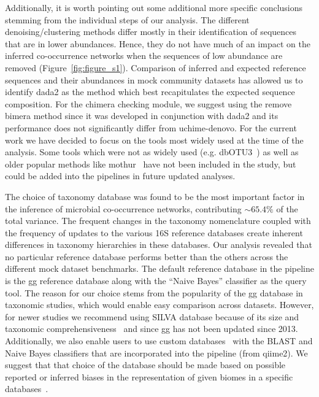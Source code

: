   Additionally, it is worth pointing out some additional more specific conclusions stemming from the individual steps of our analysis.
  The different denoising/clustering methods differ mostly in their identification of sequences that are in lower abundances.
  Hence, they do not have much of an impact on the inferred co-occurrence networks when the sequences of low abundance are removed (Figure~\ref{fig:figure_s1}).
  Comparison of inferred and expected reference sequences and their abundances in mock community datasets has allowed us to identify \ac{dada2} as the method which best recapitulates the expected sequence composition.
  For the chimera checking module, we suggest using the remove bimera method since it was developed in conjunction with \ac{dada2} and its performance does not significantly differ from uchime-denovo.
  For the current work we have decided to focus on the tools most widely used at the time of the analysis.
  Some tools which were not as widely used (e.g. dbOTU3~\cite{Olesen2017}) as well as older popular methods like mothur~\cite{Schloss2009} have not been included in the study, but could be added into the pipelines in future updated analyses.

  The choice of taxonomy database was found to be the most important factor in the inference of microbial co-occurrence networks, contributing $\sim65.4\%$ of the total variance.
  The frequent changes in the taxonomy nomenclature coupled with the frequency of updates to the various 16S reference databases create inherent differences \cite{Balvociute2017} in taxonomy hierarchies in these databases.
  Our analysis revealed that no particular reference database performs better than the others across the different mock dataset benchmarks.
  The default reference database in the pipeline is the \ac{gg} reference database along with the ``Naive Bayes'' classifier as the query tool.
  The reason for our choice stems from the popularity of the \ac{gg} database in taxonomic studies, which would enable easy comparison across datasets.
  However, for newer studies we recommend using SILVA database because of its size and taxonomic comprehensiveness~\cite{iiRESCRIPtReproducibleSequence2021} and since \ac{gg} has not been updated since 2013.
  Additionally, we also enable users to use custom databases~\cite{Ritari2015,iiRESCRIPtReproducibleSequence2021} with the BLAST and Naive Bayes classifiers that are incorporated into the pipeline (from \ac{qiime2}).
  We suggest that that choice of the database should be made based on possible reported or inferred biases in the representation of given biomes in a specific databases~\cite{Balvociute2017,iiRESCRIPtReproducibleSequence2021}.

